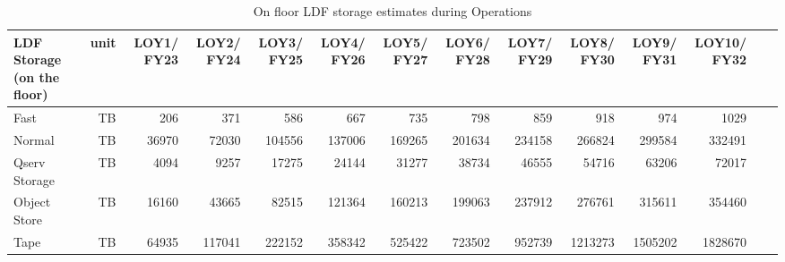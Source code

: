 \tiny \begin{longtable} { |p{}  |r  |r  |r  |r  |r  |r  |r  |r  |r  |r  |r  |r  |r |} 
\caption{On floor LDF storage estimates during Operations
 \label{tab:storageFloorOps}}\\ 
\hline 
\textbf{LDF Storage (on the floor)}&\textbf{unit}&\textbf{LOY1/ FY23}&\textbf{LOY2/ FY24}&\textbf{LOY3/ FY25}&\textbf{LOY4/ FY26}&\textbf{LOY5/ FY27}&\textbf{LOY6/ FY28}&\textbf{LOY7/ FY29}&\textbf{LOY8/ FY30}&\textbf{LOY9/ FY31}&\textbf{LOY10/ FY32}& \\ \hline
{Fast}&{TB}&{206}&{371}&{586}&{667}&{735}&{798}&{859}&{918}&{974}&{1029}& \\ \hline
{Normal}&{TB}&{36970}&{72030}&{104556}&{137006}&{169265}&{201634}&{234158}&{266824}&{299584}&{332491}& \\ \hline
{Qserv Storage}&{TB}&{4094}&{9257}&{17275}&{24144}&{31277}&{38734}&{46555}&{54716}&{63206}&{72017}& \\ \hline
{Object Store}&{TB}&{16160}&{43665}&{82515}&{121364}&{160213}&{199063}&{237912}&{276761}&{315611}&{354460}& \\ \hline
{Tape}&{TB}&{64935}&{117041}&{222152}&{358342}&{525422}&{723502}&{952739}&{1213273}&{1505202}&{1828670}& \\ \hline
\end{longtable} \normalsize
